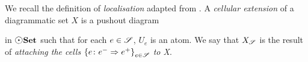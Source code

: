 \begin{dfn} \label{dfn:localisation}
    We recall the definition of \emph{localisation} adapted from \cite[Section 2.4]{chanavat2024model}.
    A \emph{cellular extension} of a diagrammatic set \( X \) is a pushout diagram
    \begin{center}
    \end{center}
    in \( \dgmSet \) such that for each \( e \in \mathscr{S} \), \( U_e \) is an atom.
    We say that \( X_{\mathscr{S}} \) is the result of \emph{attaching the cells \( \left\{ {e \colon e^- \Rightarrow e^+} \right\}_{e \in \mathscr{S}} \) to X}.


\end{dfn}

